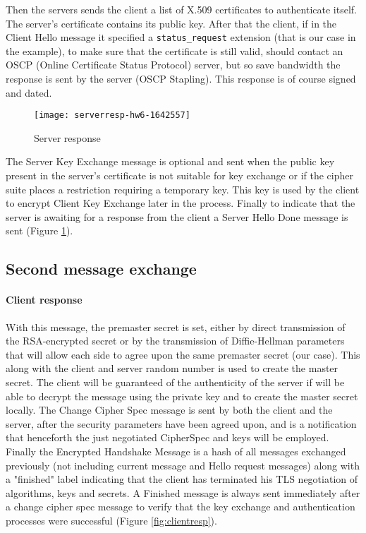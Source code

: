 \documentclass[11pt]{article}
\begin{document}
Then the servers sends the client a list of X.509 certificates to authenticate itself. The server’s certificate contains its public key. After that the client, if in the Client Hello message it specified a \texttt{status\_request} extension (that is our case in the example), to make sure that the certificate is still valid, should contact an OSCP (Online Certificate Status Protocol) server, but so save bandwidth the response is sent by the server (OSCP Stapling). This response is of course signed and dated.

\begin{figure}[h]
\texttt{[image: serverresp-hw6-1642557]}
\centering
\caption{Server response}
\label{fig:serverresp}
\end{figure}

The Server Key Exchange message is optional and sent when the public key present in the server’s certificate is not suitable for key exchange or if the cipher suite places a restriction requiring a temporary key. This key is used by the client to encrypt Client Key Exchange later in the process. Finally to indicate that the server is awaiting for a response from the client a Server Hello Done message is sent (Figure \ref{fig:serverresp}).

\subsection*{Second message exchange}
\paragraph*{Client response}
With this message, the premaster secret is set, either by direct transmission of the RSA-encrypted secret or by the transmission of Diffie-Hellman parameters that will allow each side to agree upon the same premaster secret (our case). This along with the client and server random number is used to create the master secret. The client will be guaranteed of the authenticity of the server if will be able to decrypt the message using the private key and to create the master secret locally. The Change Cipher Spec message is sent by both the client and the server, after the security parameters have been agreed upon, and is a notification that henceforth the just negotiated CipherSpec and keys will be employed. Finally the Encrypted Handshake Message is a hash of all messages exchanged previously (not including current message and Hello request messages) along with a "finished" label indicating that the client has terminated his TLS negotiation of algorithms, keys and secrets. A Finished message is always sent immediately after a change cipher spec message to verify that the key exchange and authentication processes were successful (Figure \ref{fig:clientresp}).
\end{document}
